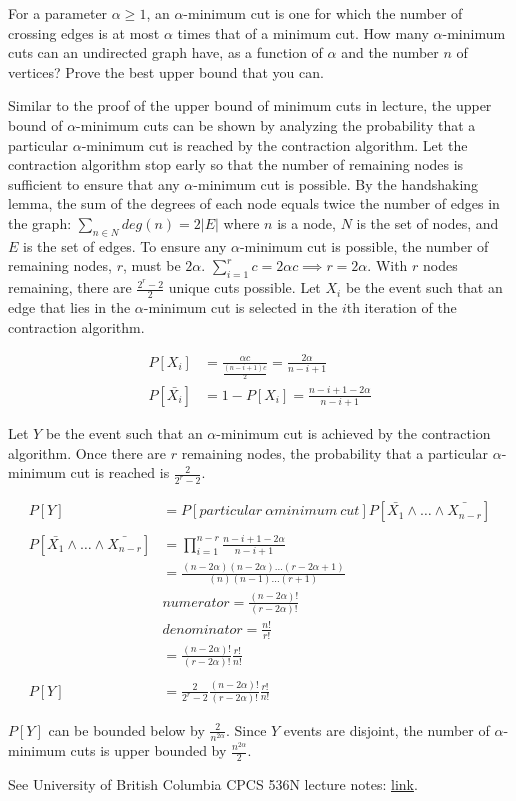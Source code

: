 \documentclass[10pt]{article}
\begin{document}
For a parameter $\alpha \geq 1$, an $\alpha$-minimum cut is one for which the number of crossing edges is at most $\alpha$ times that of a minimum cut. How many $\alpha$-minimum cuts can an undirected graph have, as a function of $\alpha$ and the number $n$ of vertices? Prove the best upper bound that you can.
\bigskip

Similar to the proof of the upper bound of minimum cuts in lecture, the upper bound of $\alpha$-minimum cuts can be shown by analyzing the probability that a particular $\alpha$-minimum cut is reached by the contraction algorithm. Let the contraction algorithm stop early so that the number of remaining nodes is sufficient to ensure that any $\alpha$-minimum cut is possible. By the handshaking lemma, the sum of the degrees of each node equals twice the number of edges in the graph: $\sum_{n \in N} deg(n) = 2|E|$ where $n$ is a node, $N$ is the set of nodes, and $E$ is the set of edges. To ensure any $\alpha$-minimum cut is possible, the number of remaining nodes, $r$, must be $2 \alpha$. $\sum_{i=1}^{r} c = 2 \alpha c \implies r = 2 \alpha$. With $r$ nodes remaining, there are $\frac{2^r - 2}{2}$ unique cuts possible. Let $X_i$ be the event such that an edge that lies in the $\alpha$-minimum cut is selected in the $i$th iteration of the contraction algorithm.

\begin{align*}
	P[X_i] &= \frac{\alpha c}{\frac{(n - i + 1)c}{2}} = \frac{2 \alpha}{n - i + 1} \\
	P[\bar{X_i}] &= 1 - P[X_i] = \frac{n - i + 1 - 2 \alpha}{n - i + 1}
\end{align*}

Let $Y$ be the event such that an $\alpha$-minimum cut is achieved by the contraction algorithm. Once there are $r$ remaining nodes, the probability that a particular $\alpha$-minimum cut is reached is $\frac{2}{2^r - 2}$.

\begin{align*}
	P[Y] &= P[particular \ \alpha minimum \ cut] P[\bar{X_1} \wedge \dots \wedge \bar{X_{n-r}}] \\ \\
	P[\bar{X_1} \wedge \dots \wedge \bar{X_{n-r}}] &= \prod_{i=1}^{n-r} \frac{n - i + 1 - 2 \alpha}{n - i + 1} \\
	&= \frac{(n - 2\alpha)(n - 2\alpha) \dots (r - 2\alpha + 1)}{(n)(n - 1) \dots (r + 1)} \\
	& numerator = \frac{(n - 2\alpha)!}{(r - 2\alpha)!} \\
	& denominator = \frac{n!}{r!} \\
	&= \frac{(n - 2\alpha)!}{(r - 2\alpha)!} \frac{r!}{n!} \\ \\
	P[Y] &= \frac{2}{2^r - 2} \frac{(n - 2\alpha)!}{(r - 2\alpha)!} \frac{r!}{n!}
\end{align*}

$P[Y]$ can be bounded below by $\frac{2}{n^{2\alpha}}$. Since $Y$ events are disjoint, the number of $\alpha$-minimum cuts is upper bounded by $\frac{n^{2\alpha}}{2}$.
\smallskip

See University of British Columbia CPCS 536N lecture notes: \href{https://www.cs.ubc.ca/~nickhar/W13/Scribe/Lecture7Scribe.pdf}{link}.
\end{document}
